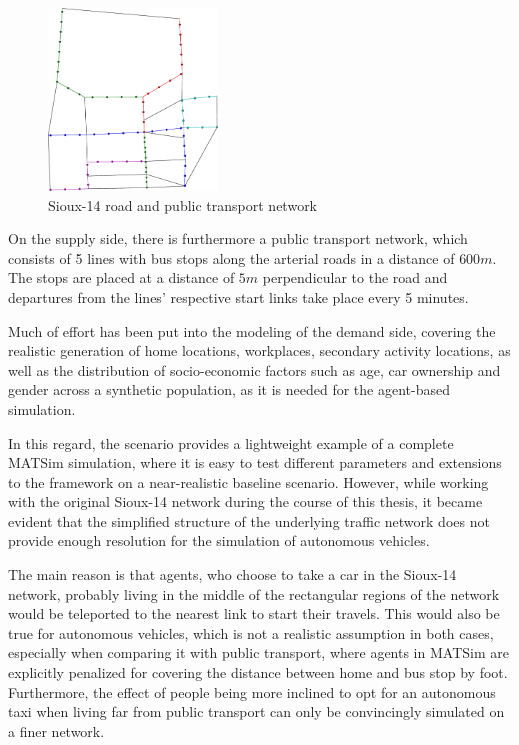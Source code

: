 \begin{figure}
    \centering
    \includegraphics[width=0.4\textwidth]{figures/sioux14_pt_cropped.pdf}
    \caption{Sioux-14 road and public transport network}
    \label{fig:sioux14}
\end{figure}

On the supply side, there is furthermore a public transport network, which
consists of 5 lines with bus stops along the arterial roads in a distance of $600m$.
The stops are placed at a distance of $5m$ perpendicular to the road and departures
from the lines' respective start links take place every 5 minutes.

Much of effort has been put into the modeling of the demand side, covering the
realistic generation of home locations, workplaces, secondary activity locations,
as well as the distribution of socio-economic factors such as age, car ownership
and gender across a synthetic population, as it is needed for the agent-based
simulation.

In this regard, the scenario provides a lightweight example of a complete MATSim
simulation, where it is easy to test different parameters and extensions to the
framework on a near-realistic baseline scenario. However, while working with the
original Sioux-14 network during the course of this thesis, it became evident that
the simplified structure of the underlying traffic network does not provide enough
resolution for the simulation of autonomous vehicles.

The main reason is that agents, who choose to take a car in the Sioux-14 network,
probably living in the middle of the rectangular regions of the network would be
teleported to the nearest link to start their travels. This would also be true
for autonomous vehicles, which is not a realistic assumption in both cases, especially
when comparing it with public transport, where agents in MATSim are explicitly
penalized for covering the distance between home and bus stop by foot.
Furthermore, the effect of people being more inclined to opt for an autonomous taxi
when living far from public transport can only be convincingly simulated on a
finer network.

